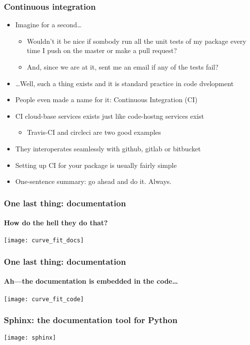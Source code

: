 \documentclass[9pt]{beamer}
\begin{document}
\begin{frame}
  \frametitle{Continuous integration}
  \begin{itemize}
  \item Imagine for a second\ldots
    \begin{itemize}
    \item Wouldn't it be nice if sombody run all the unit tests of my
      package every time I push on the master or make a pull request?
    \item And, since we are at it, sent me an email if any of the tests fail?
    \end{itemize}
  \item \ldots Well, such a thing exists and it is standard practice in
    code dvelopment
  \item People even made a name for it: \alert{Continuous Integration (CI)}
  \item CI cloud-base services exists just like code-hostng services exist
    \begin{itemize}
    \item Travis-CI and circleci are two good examples
    \end{itemize}
  \item They interoperates seamlessly with github, gitlab or bitbucket
  \item Setting up CI for your package is usually fairly simple
  \item \alert{One-sentence summary: go ahead and do it. Always.}
  \end{itemize}
\end{frame}


\begin{frame}
  \frametitle{One last thing: documentation}
  \framesubtitle{How do the hell they do that?}
  \texttt{[image: curve\_fit\_docs]}
\end{frame}


\begin{frame}
  \frametitle{One last thing: documentation}
  \framesubtitle{Ah---the documentation is embedded in the code\ldots}
  \centering\texttt{[image: curve\_fit\_code]}
  
\end{frame}


\begin{frame}
  \frametitle{Sphinx: the documentation tool for Python}
  \centering\texttt{[image: sphinx]}
  
\end{frame}
\end{document}
